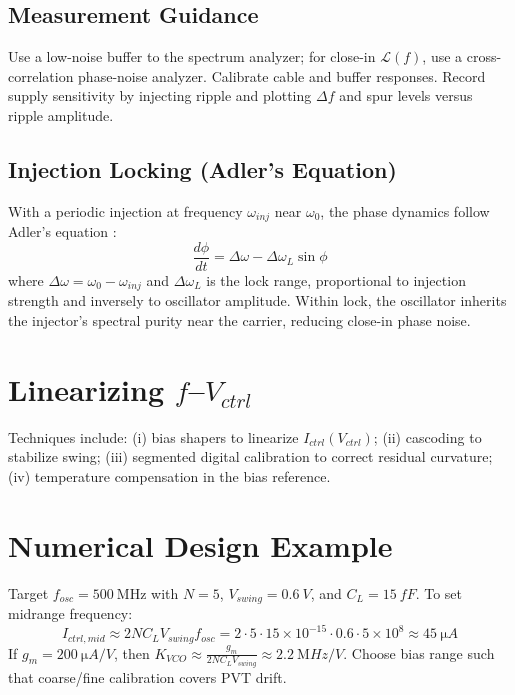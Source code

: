 \subsection*{Measurement Guidance}
Use a low-noise buffer to the spectrum analyzer; for close-in \(\mathcal{L}(f)\), use a cross-correlation phase-noise analyzer. Calibrate cable and buffer responses. Record supply sensitivity by injecting ripple and plotting \(\Delta f\) and spur levels versus ripple amplitude.

\subsection*{Injection Locking (Adler's Equation)}
With a periodic injection at frequency \(\omega_{inj}\) near \(\omega_0\), the phase dynamics follow Adler's equation \cite{adler1946}:
\[
 \frac{d\phi}{dt} = \Delta\omega - \Delta\omega_L \sin\phi
\]
where \(\Delta\omega = \omega_0 - \omega_{inj}\) and \(\Delta\omega_L\) is the lock range, proportional to injection strength and inversely to oscillator amplitude. Within lock, the oscillator inherits the injector's spectral purity near the carrier, reducing close-in phase noise.

\section{Linearizing \(f\)–\(V_{ctrl}\)}
Techniques include: (i) bias shapers to linearize \(I_{ctrl}(V_{ctrl})\); (ii) cascoding to stabilize swing; (iii) segmented digital calibration to correct residual curvature; (iv) temperature compensation in the bias reference.

\section{Numerical Design Example}
Target \(f_{osc}=\SI{500}{\mega\hertz}\) with \(N=5\), \(V_{swing}=\SI{0.6}{V}\), and \(C_L=\SI{15}{fF}\). To set midrange frequency:
\[
 I_{ctrl,mid} \approx 2 N C_L V_{swing} f_{osc} = 2\cdot 5\cdot 15\times10^{-15}\cdot 0.6\cdot 5\times10^{8} \approx \SI{45}{\micro A}
\]
If \(g_m=\SI{200}{\micro A/V}\), then \(K_{VCO}\approx \tfrac{g_m}{2 N C_L V_{swing}} \approx \SI{2.2}{\mega Hz/V}\). Choose bias range such that coarse/fine calibration covers PVT drift.

